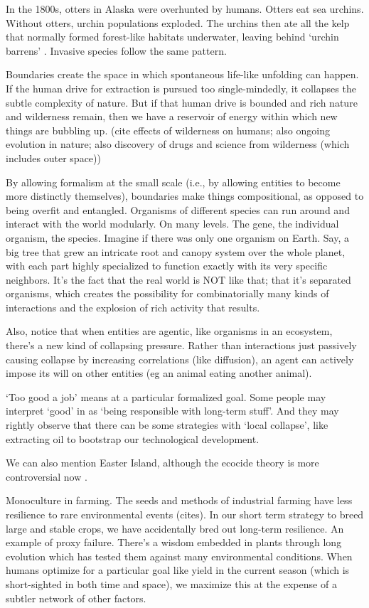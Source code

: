 In the 1800s, otters in Alaska were overhunted by humans. Otters eat sea urchins. Without otters, urchin populations exploded. The urchins then ate all the kelp that normally formed forest-like habitats underwater, leaving behind `urchin barrens' \citep{estes1974sea}. Invasive species follow the same pattern. 

Boundaries create the space in which spontaneous life-like unfolding can happen. If the human drive for extraction is pursued too single-mindedly, it collapses the subtle complexity of nature. But if that human drive is bounded and rich nature and wilderness remain, then we have a reservoir of energy within which new things are bubbling up. (cite effects of wilderness on humans; also ongoing evolution in nature; also discovery of drugs and science from wilderness (which includes outer space)) 

By allowing formalism at the small scale (i.e., by allowing entities to become more distinctly themselves), boundaries make things compositional, as opposed to being overfit and entangled. Organisms of different species can run around and interact with the world modularly. On many levels. The gene, the individual organism, the species. Imagine if there was only one organism on Earth. Say, a big tree that grew an intricate root and canopy system over the whole planet, with each part highly specialized to function exactly with its very specific neighbors. It's the fact that the real world is NOT like that; that it's separated organisms, which creates the possibility for combinatorially many kinds of interactions and the explosion of rich activity that results.

Also, notice that when entities are agentic, like organisms in an ecosystem, there's a new kind of collapsing pressure. Rather than interactions just passively causing collapse by increasing correlations (like diffusion), an agent can actively impose its will on other entities (eg an animal eating another animal). 

`Too good a job' means at a particular formalized goal. Some people may interpret `good' in as `being responsible with long-term stuff'. And they may rightly observe that there can be some strategies with `local collapse', like extracting oil to bootstrap our technological development.

We can also mention Easter Island, although the ecocide theory is more controversial now \citep{moreno2024ancient}. 

Monoculture in farming. The seeds and methods of industrial farming have less resilience to rare environmental events (cites). In our short term strategy to breed large and stable crops, we have accidentally bred out long-term resilience. An example of proxy failure. There's a wisdom embedded in plants through long evolution which has tested them against many environmental conditions. When humans optimize for a particular goal like yield in the current season (which is short-sighted in both time and space), we maximize this at the expense of a subtler network of other factors.

